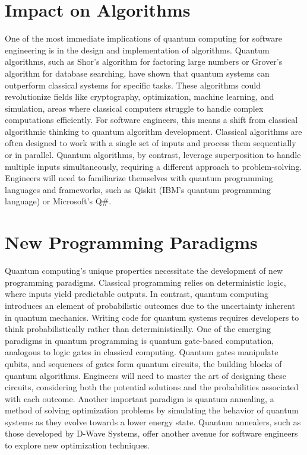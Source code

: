\documentclass{article}
\begin{document}
\section{Impact on Algorithms}
One of the most immediate implications of quantum computing for software engineering is in the design and implementation of algorithms. Quantum algorithms, such as Shor’s algorithm for factoring large numbers or Grover’s algorithm for database searching, have shown that quantum systems can outperform classical systems for specific tasks. These algorithms could revolutionize fields like cryptography, optimization, machine learning, and simulation, areas where classical computers struggle to handle complex computations efficiently.
For software engineers, this means a shift from classical algorithmic thinking to quantum algorithm development. Classical algorithms are often designed to work with a single set of inputs and process them sequentially or in parallel. Quantum algorithms, by contrast, leverage superposition to handle multiple inputs simultaneously, requiring a different approach to problem-solving. Engineers will need to familiarize themselves with quantum programming languages and frameworks, such as Qiskit (IBM’s quantum programming language) or Microsoft’s Q\#.

\section{New Programming Paradigms}
Quantum computing’s unique properties necessitate the development of new programming paradigms. Classical programming relies on deterministic logic, where inputs yield predictable outputs. In contrast, quantum computing introduces an element of probabilistic outcomes due to the uncertainty inherent in quantum mechanics. Writing code for quantum systems requires developers to think probabilistically rather than deterministically.
One of the emerging paradigms in quantum programming is quantum gate-based computation, analogous to logic gates in classical computing. Quantum gates manipulate qubits, and sequences of gates form quantum circuits, the building blocks of quantum algorithms. Engineers will need to master the art of designing these circuits, considering both the potential solutions and the probabilities associated with each outcome.
Another important paradigm is quantum annealing, a method of solving optimization problems by simulating the behavior of quantum systems as they evolve towards a lower energy state. Quantum annealers, such as those developed by D-Wave Systems, offer another avenue for software engineers to explore new optimization techniques.
\end{document}
